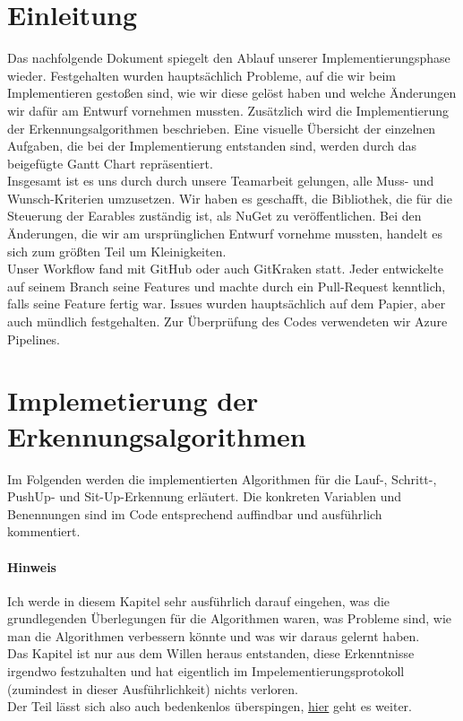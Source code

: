 \documentclass[a4paper,12pt]{article}
\title{\projektName}
\date{\today}
\author{Tec O'Brain}
\begin{document}
\setcounter{page}{2}
\tableofcontents          %
\clearpage
{}

\section{Einleitung}
Das nachfolgende Dokument spiegelt den Ablauf unserer Implementierungsphase wieder. Festgehalten wurden hauptsächlich Probleme, auf die wir beim Implementieren gestoßen sind, wie wir diese gelöst haben und welche Änderungen wir dafür am Entwurf vornehmen mussten. Zusätzlich wird die Implementierung der Erkennungsalgorithmen beschrieben. Eine visuelle Übersicht der einzelnen Aufgaben, die bei der Implementierung entstanden sind, werden durch das beigefügte Gantt Chart repräsentiert.\\
Insgesamt ist es uns durch durch unsere Teamarbeit gelungen, alle Muss- und Wunsch-Kriterien umzusetzen. Wir haben es geschafft, die Bibliothek, die für die Steuerung der Earables zuständig ist, als NuGet zu veröffentlichen. Bei den Änderungen, die wir am ursprünglichen Entwurf vornehme mussten, handelt es sich zum größten Teil um Kleinigkeiten.\\
Unser Workflow fand mit GitHub oder auch GitKraken statt. Jeder entwickelte auf seinem Branch seine Features und machte durch ein Pull-Request kenntlich, falls seine Feature fertig war. Issues wurden hauptsächlich auf dem Papier, aber auch mündlich festgehalten. Zur Überprüfung des Codes verwendeten wir Azure Pipelines.



\section{Implemetierung der Erkennungsalgorithmen}
\label{algorithmen}
Im Folgenden werden die implementierten Algorithmen für die Lauf-, Schritt-, PushUp- und  Sit-Up-Erkennung erläutert. Die konkreten Variablen und Benennungen sind im Code entsprechend auffindbar und ausführlich kommentiert.
\paragraph{Hinweis}

Ich werde in diesem Kapitel sehr ausführlich darauf eingehen, was die grundlegenden Überlegungen für die Algorithmen waren, was Probleme sind, wie man die Algorithmen verbessern könnte und was wir daraus gelernt haben.\\
Das Kapitel ist nur aus dem Willen heraus entstanden, diese Erkenntnisse irgendwo festzuhalten und hat eigentlich im Impelementierungsprotokoll (zumindest in dieser Ausführlichkeit) nichts verloren.\\
Der Teil lässt sich also auch bedenkenlos überspingen, \hyperref[aenderungen]{hier} geht es weiter.   
\end{document}
